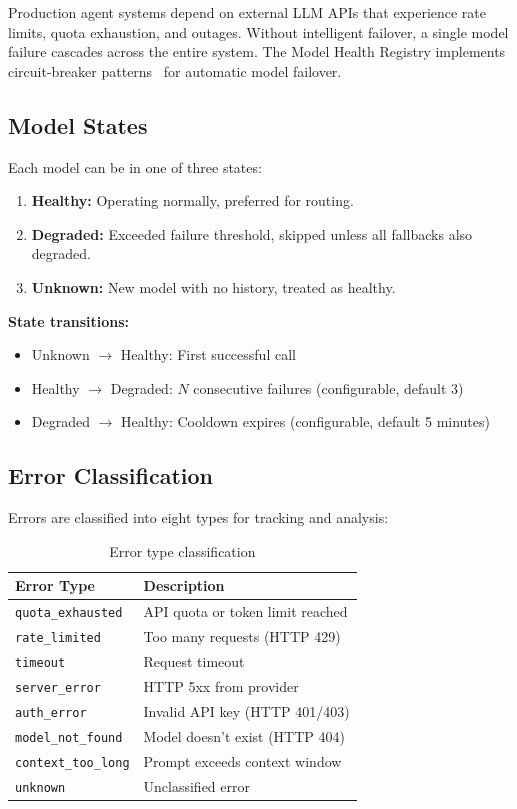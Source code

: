\documentclass{article}
\begin{document}
Production agent systems depend on external LLM APIs that experience rate limits, quota exhaustion, and outages. Without intelligent failover, a single model failure cascades across the entire system. The Model Health Registry implements circuit-breaker patterns~\cite{ford2000circuit} for automatic model failover.

\subsection{Model States}

Each model can be in one of three states:

\begin{enumerate}[leftmargin=*]
    \item \textbf{Healthy:} Operating normally, preferred for routing.
    \item \textbf{Degraded:} Exceeded failure threshold, skipped unless all fallbacks also degraded.
    \item \textbf{Unknown:} New model with no history, treated as healthy.
\end{enumerate}

\textbf{State transitions:}
\begin{itemize}[leftmargin=*]
    \item Unknown $\to$ Healthy: First successful call
    \item Healthy $\to$ Degraded: $N$ consecutive failures (configurable, default 3)
    \item Degraded $\to$ Healthy: Cooldown expires (configurable, default 5 minutes)
\end{itemize}

\subsection{Error Classification}

Errors are classified into eight types for tracking and analysis:

\begin{table}[h]
\centering
\caption{Error type classification}
\label{tab:errors}
\small
\begin{tabular}{ll}
\toprule
\textbf{Error Type} & \textbf{Description} \\
\midrule
\texttt{quota\_exhausted} & API quota or token limit reached \\
\texttt{rate\_limited} & Too many requests (HTTP 429) \\
\texttt{timeout} & Request timeout \\
\texttt{server\_error} & HTTP 5xx from provider \\
\texttt{auth\_error} & Invalid API key (HTTP 401/403) \\
\texttt{model\_not\_found} & Model doesn't exist (HTTP 404) \\
\texttt{context\_too\_long} & Prompt exceeds context window \\
\texttt{unknown} & Unclassified error \\
\bottomrule
\end{tabular}
\end{table}
\end{document}
